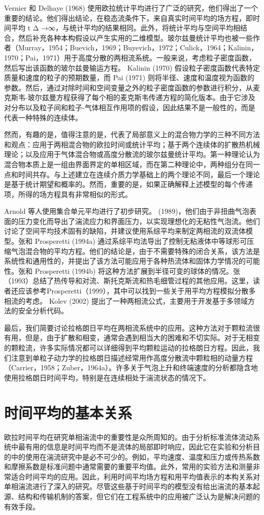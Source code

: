 \documentclass[11pt,a4paper,openany,fontset=none]{ctexbook}
\begin{document}
Vernier 和 Delhaye (1968) 使用欧拉统计平均进行了广泛的研究，他们得出了一个重要的结论。他们得出结论，在稳态流条件下，来自真实时间平均的场方程，即时间平均
t Δ →∞，与统计平均的结果相同。此外，将统计平均与空间平均相结合，然后补充各种本构假设以产生实用的二维模型。玻尔兹曼统计平均也被一些作者（Murray，1954；Buevich，1969；Buyevich，1972；Culick，1964；Kalinin，1970；Pai，1971）用于高度分散的两相流系统。一般来说，考虑粒子密度函数，然后写出该函数的玻尔兹曼输运方程。 Kalinin (1970) 假设粒子密度函数代表特定质量和速度的粒子的预期数量，而 Pai (1971) 则将半径、速度和温度视为函数的参数。然后，通过对除时间和空间变量之外的粒子密度函数的参数进行积分，从麦克斯韦-玻尔兹曼方程获得了每个相的麦克斯韦传递方程的简化版本。由于它涉及对分布以及粒子间和粒子-气体相互作用项的假设，因此结果不是一般性的，而是代表一种特殊的连续体。

然而，有趣的是，值得注意的是，代表了局部意义上的混合物力学的三种不同方法和观点：应用于两相混合物的欧拉时间或统计平均；基于两个连续体的扩散热机械理论；以及应用于气体混合物或高度分散流的玻尔兹曼统计平均。第一种理论认为混合物本质上是一组由界面界定的单相区域，而在第二种理论中，两种组分在同一点和时间共存。与上述建立在连续介质力学基础上的两个理论不同，最后一个理论是基于统计期望和概率的。然而，重要的是，如果正确解释上述模型的每个传递项，所得的场方程具有非常相似的形式。

Arnold 等人使用集合单元平均进行了初步研究。 (1989)，他们由于非扭曲气泡表面的压力变化而导出了湍流应力和界面压力，以实现理想化的无粘性气泡流。他们讨论了空间平均技术固有的缺陷，并建议使用系综平均来制定两相流的双流体模型。张和 Prosperetti (1994a) 通过系综平均法导出了控制无粘液体中等球形可压缩气泡混合物的平均方程。他们的结论是，由于不需要特殊的闭合关系，该方法是系统性和通用性的，并提出了该方法可能应用于各种热流体和固体力学情况的可能性。张和 Prosperetti (1994b) 将这种方法扩展到半径可变的球体的情况。张（1993）总结了热传导和对流、斯托克斯流和热毛细管过程的其他应用。这里，读者还应该参考Prosperetti（1999），其中可以找到一些关于用平均方程模拟分散多相流的考虑。 Kolev (2002) 提出了一种两相流公式，主要用于开发基于多领域方法的安全分析代码。

最后，我们简要讨论拉格朗日平均在两相流系统中的应用。这种方法对于颗粒流很有用，但是，由于扩散和相变，通常会遇到相当大的困难和不切实际。对于无相变的颗粒流，许多实际情况都可以详细得到平均颗粒运动的拉格朗日方程。因此，我们注意到单粒子动力学的拉格朗日描述经常用作高度分散流中颗粒相的动量方程（Carrier，1958；Zuber，1964a）。许多关于气泡上升和终端速度的分析都隐含地使用拉格朗日时间平均，特别是在连续相处于湍流状态的情况下。

\chapter{时间平均的基本关系}
欧拉时间平均在研究单相湍流中的重要性是众所周知的。由于分析标准流体流动系统中最有用的信息是时间平均而不是流体的局部即时响应，因此它在实验和分析目的中的使用在湍流研究中是必不可少的。例如，平均速度、温度和压力或传热系数和摩擦系数是标准问题中通常需要的重要平均值。此外，常用的实验方法和测量非常适合时间平均的应用。因此，利用时间平均场方程和用平均值表示的本构关系对单相湍流进行了深入的研究。尽管这些基于时间平均的模型没有给出湍流的基本起源、结构和传输机制的答案，但它们在工程系统中的应用被广泛认为是解决问题的有效手段。
\end{document}
